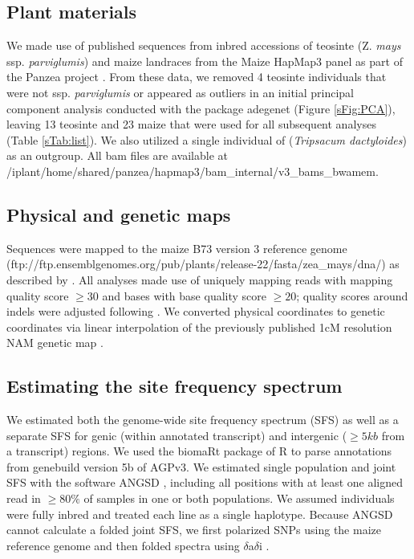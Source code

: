 \documentclass{pnastwo}
\begin{document}
\begin{article}
\begin{materials}
\subsection{Plant materials}
We made use of published sequences from inbred accessions of teosinte (Z. {\it mays} ssp. {\it parviglumis}) and maize landraces from the Maize HapMap3 panel as part of the Panzea project  \cite{chia2012, lemmon2014, bukowski2015}. 
From these data, we removed 4 teosinte individuals that were not ssp. \textit{parviglumis} or appeared as outliers in an initial principal component analysis conducted with the package adegenet \cite{jombart2011} (Figure \ref{sFig:PCA}), leaving 13 teosinte and 23 maize that were used for all subsequent analyses (Table \ref{sTab:list}). We also utilized a single individual of (\textit{Tripsacum dactyloides}) as an outgroup.  All bam files are available at /iplant/home/shared/panzea/hapmap3/bam\_internal/v3\_bams\_bwamem. 

\subsection{Physical and genetic maps}
Sequences were mapped to the maize B73 version 3 reference genome \cite{schnable2009} (ftp://ftp.ensemblgenomes.org/pub/plants/release-22/fasta/zea\_mays/dna/) as described by \cite{bukowski2015}. 
All analyses made use of uniquely mapping reads with mapping quality score $\geq  30$ and bases with base quality score $\geq 20$; quality scores around indels were adjusted following \cite{li2011statistical}.
We converted physical coordinates to genetic coordinates via linear interpolation of the previously published 1cM resolution NAM genetic map \cite{glaubitz2014}. 

\subsection{Estimating the site frequency spectrum}
We estimated both the genome-wide site frequency spectrum (SFS) as well as a separate SFS for genic (within annotated transcript) and intergenic ($\geq 5kb$ from a transcript) regions. 
We used the biomaRt package \cite{durinck2009,durinck2005} of R \cite{R2014} to parse annotations from genebuild version 5b of AGPv3. 
We estimated single population and joint SFS with the software ANGSD \cite{korneliussen2014}, including all positions with at least one aligned read in $\geq 80\%$ of samples in one or both populations.
We assumed individuals were fully inbred and treated each line as a single haplotype. Because ANGSD cannot calculate a folded joint SFS, we first polarized SNPs using the maize reference genome and then folded spectra using $\delta$a$\delta$i \cite{gutenkunst2009}.


\end{materials}
\end{article}
\end{document}
